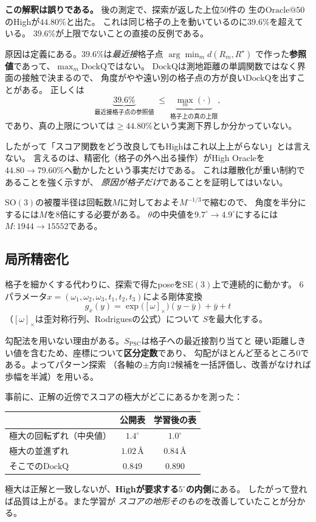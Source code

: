 \documentclass[11pt,a4paper]{article}
\newcommand{\SOthree}{\mathrm{SO}(3)}
\newcommand{\dockq}{\mathrm{DockQ}}
\begin{document}
\textbf{この解釈は誤りである。} 後の測定で、探索が返した上位$50$件の
生の$\mathrm{Oracle}@50$のHighが$\mathbf{44.80\%}$と出た。
これは同じ格子の上を動いているのに$39.6\%$を超えている。
$39.6\%$が上限でないことの直接の反例である。

原因は定義にある。$39.6\%$は\emph{最近接}格子点
$\arg\min_m d(R_m, R^\star)$
で作った\textbf{参照値}であって、$\max_m \dockq$ではない。
$\dockq$は測地距離の単調関数ではなく界面の接触で決まるので、
角度がやや遠い別の格子点の方が良い$\dockq$を出すことがある。
正しくは
\begin{equation}
  \underbrace{39.6\%}_{\text{最近接格子点の参照値}}
  \;\le\; \underbrace{\max_{m}(\cdot)}_{\text{格子上の真の上限}},
\end{equation}
であり、真の上限については$\ge 44.80\%$という実測下界しか分かっていない。

したがって「スコア関数をどう改良してもHighはこれ以上上がらない」とは言えない。
言えるのは、精密化（格子の外へ出る操作）がHigh Oracleを
$44.80 \to 79.60\%$へ動かしたという事実だけである。
これは離散化が重い制約であることを強く示すが、
\emph{原因が格子だけ}であることを証明してはいない。

$\SOthree$の被覆半径は回転数$M$に対しておよそ$M^{-1/3}$で縮むので、
角度を半分にするには$M$を$8$倍にする必要がある。
$\theta$の中央値を$9.7^\circ \to 4.9^\circ$にするには$M: 1944 \to 15552$である。

\subsection{局所精密化}

格子を細かくする代わりに、探索で得たposeを$\mathrm{SE}(3)$上で連続的に動かす。
$6$パラメータ$x = (\omega_1,\omega_2,\omega_3, t_1,t_2,t_3)$による剛体変換
\begin{equation}
  g_x(y) = \exp\bigl([\omega]_\times\bigr)(y - \bar y) + \bar y + t
\end{equation}
（$[\omega]_\times$は歪対称行列、Rodriguesの公式）について
$S$を最大化する。

勾配法を用いない理由がある。$S_{\mathrm{PSC}}$は格子への最近接割り当てと
硬い距離しきい値を含むため、座標について\textbf{区分定数}であり、
勾配がほとんど至るところ$0$である。よってパターン探索
（各軸の$\pm$方向$12$候補を一括評価し、改善がなければ歩幅を半減）を用いる。

事前に、正解の近傍でスコアの極大がどこにあるかを測った：
\begin{center}
\begin{tabular}{lcc}
\toprule
 & 公開表 & 学習後の表 \\
\midrule
極大の回転ずれ（中央値） & $1.4^\circ$ & $\mathbf{1.0^\circ}$ \\
極大の並進ずれ & $1.02$\,\AA & $\mathbf{0.84}$\,\AA \\
そこでの$\dockq$ & $0.849$ & $\mathbf{0.890}$ \\
\bottomrule
\end{tabular}
\end{center}
極大は正解と一致しないが、\textbf{Highが要求する$5^\circ$の内側}にある。
したがって登れば品質は上がる。また学習が
\emph{スコアの地形そのもの}を改善していたことが分かる。
\end{document}
